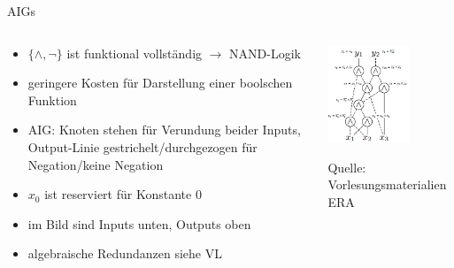 \documentclass[
  german,            %
  aspectratio=169,    %
]{tumbeamer}
\begin{document}
\begin{frame}[fragile, c]{AIGs}{}
  \begin{columns}[c]
    \begin{column}{0.5\textwidth}
      \begin{itemize}
        \item $\{\wedge, \neg\}$ ist funktional vollständig $\rightarrow$ NAND-Logik
        \item geringere Kosten für Darstellung einer boolschen Funktion
        \item AIG: Knoten stehen für Verundung beider Inputs, Output-Linie gestrichelt/durchgezogen für Negation/keine Negation
        \item $x_0$ ist reserviert für Konstante $0$
        \item im Bild sind Inputs unten, Outputs oben
        \item algebraische Redundanzen siehe VL
      \end{itemize}
    \end{column}
    \begin{column}{0.5\textwidth}
      \begin{center}
        \includegraphics[width=0.65\textwidth]{w12_aig.png}
      \end{center}
      \centering
      \tiny{Quelle: Vorlesungsmaterialien ERA}
    \end{column}
  \end{columns}
\end{frame}
\end{document}
